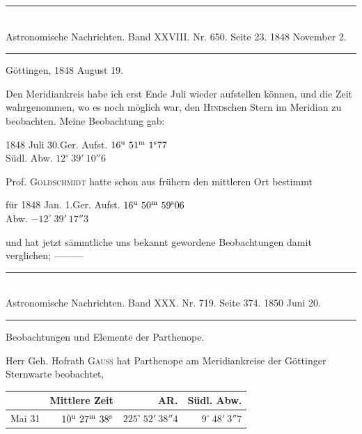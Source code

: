 \clearpage
{}
\begin{center}
\rule{0.55\linewidth}{0.4pt}\\[2pt]
Astronomische Nachrichten. Band XXVIII. Nr. 650. Seite 23. 1848 November 2.\\[2pt]
\rule{0.55\linewidth}{0.4pt}
\end{center}
\begin{flushright}Göttingen, 1848 August 19.\end{flushright}

Den Meridiankreis habe ich erst Ende Juli wieder aufstellen können, und die Zeit wahrgenommen, wo es noch möglich war, den \textsc{Hind}schen Stern im Meridian zu beobachten. Meine Beobachtung gab:

\begin{center}
1848 Juli 30.\quad Ger. Aufst. $16^{\rm u}\ 51^{\rm m}\ 1^{\rm s}77$\\
Südl. Abw. $12^\circ\ 39'\ 10''6$
\end{center}

Prof. \textsc{Goldschmidt} hatte schon aus frühern den mittleren Ort bestimmt

\begin{center}
für 1848 Jan. 1.\quad Ger. Aufst. $16^{\rm u}\ 50^{\rm m}\ 59^{\rm s}06$\\
Abw. $-12^\circ\ 39'\ 17''3$
\end{center}

und hat jetzt sämmtliche uns bekannt gewordene Beobachtungen damit verglichen; \mbox{---\quad---\quad---}

\clearpage
\hypertarget{native-483-parthenope}{}
\begin{center}
\rule{0.55\linewidth}{0.4pt}\\[2pt]
Astronomische Nachrichten. Band XXX. Nr. 719. Seite 374. 1850 Juni 20.\\[2pt]
\rule{0.55\linewidth}{0.4pt}
\end{center}
\begin{center}Beobachtungen und Elemente der Parthenope.\end{center}

Herr Geh. Hofrath \textsc{Gauss} hat Parthenope am Meridiankreise der Göttinger Sternwarte beobachtet,

\begin{center}
\setlength{\tabcolsep}{4pt}
\begin{tabular}{l|r|r|r}
 & Mittlere Zeit & AR. & Südl. Abw. \\\hline
Mai 31 & $10^{\rm u}\ 27^{\rm m}\ 38^{\rm s}$ & $225^\circ\ 52'\ 38''4$ & $9^\circ\ 48'\ 3''7$ \\
\end{tabular}
\end{center}

